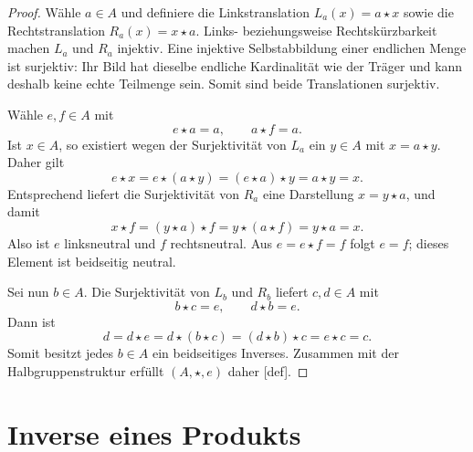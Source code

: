 \documentclass[main.tex]{subfiles}
\begin{document}
\begin{proof}
Wähle \(a\in A\) und definiere die Linkstranslation
\(L_a(x)=a\star x\) sowie die Rechtstranslation
\(R_a(x)=x\star a\).  Links- beziehungsweise Rechtskürzbarkeit machen
\(L_a\) und \(R_a\) injektiv.  Eine injektive Selbstabbildung einer endlichen
Menge ist surjektiv: Ihr Bild hat dieselbe endliche Kardinalität wie der
Träger und kann deshalb keine echte Teilmenge sein.  Somit sind beide
Translationen surjektiv.

Wähle \(e,f\in A\) mit
\[
  e\star a=a,\qquad a\star f=a.
\]
Ist \(x\in A\), so existiert wegen der Surjektivität von \(L_a\) ein
\(y\in A\) mit \(x=a\star y\).  Daher gilt
\[
  e\star x=e\star(a\star y)=(e\star a)\star y=a\star y=x.
\]
Entsprechend liefert die Surjektivität von \(R_a\) eine Darstellung
\(x=y\star a\), und damit
\[
  x\star f=(y\star a)\star f=y\star(a\star f)=y\star a=x.
\]
Also ist \(e\) linksneutral und \(f\) rechtsneutral.  Aus
\(e=e\star f=f\) folgt \(e=f\); dieses Element ist beidseitig neutral.

Sei nun \(b\in A\).  Die Surjektivität von \(L_b\) und \(R_b\) liefert
\(c,d\in A\) mit
\[
  b\star c=e,\qquad d\star b=e.
\]
Dann ist
\[
  d=d\star e=d\star(b\star c)=(d\star b)\star c=e\star c=c.
\]
Somit besitzt jedes \(b\in A\) ein beidseitiges Inverses.  Zusammen mit der
Halbgruppenstruktur erfüllt \((A,\star,e)\) daher
[def].
\end{proof}

\section{Inverse eines Produkts}
\end{document}
